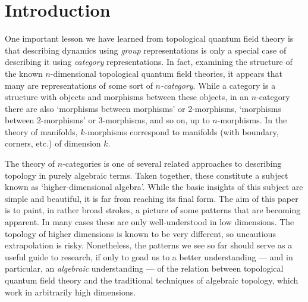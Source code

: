\section{Introduction}

One important lesson we have learned from topological quantum
field theory is that describing dynamics using {\it group}
representations is only a special case of describing it using
{\it category} representations.  In fact, examining the structure
of the known $n$-dimensional topological quantum field theories,
it appears that many are representations of some sort of {\it
$n$-category}.  While a category is a structure with objects and
morphisms between these objects, in an $n$-category there are
also `morphisms between morphisms' or 2-morphisms, `morphisms
between 2-morphisms' or 3-morphisms, and so on, up to
$n$-morphisms.  In the theory of manifolds, $k$-morphisms
correspond to manifolds (with boundary, corners, etc.) of
dimension $k$.

The theory of $n$-categories is one of several related approaches to
describing topology in purely algebraic terms.  Taken together, these
constitute a subject known as `higher-dimensional algebra'.  While
the basic insights of this subject are simple and beautiful, it is far
from reaching its final form.  The aim of this paper is to paint,
in rather broad strokes, a picture of some patterns that are
becoming apparent.  In many cases these are only well-understood in low
dimensions.  The topology of higher dimensions is known to be very
different, so uncautious extrapolation is risky.  Nonetheless, the
patterns we see so far should serve as a useful guide to research, if
only to goad us to a better understanding --- and in particular, an {\it
algebraic} understanding --- of the relation between topological
quantum field theory and the traditional techniques of algebraic
topology, which work in arbitrarily high dimensions.

